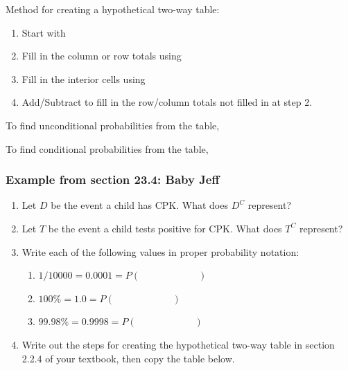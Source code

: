 \documentclass[
]{report}
\providecommand{\tightlist}{%
  \setlength{\itemsep}{0pt}\setlength{\parskip}{0pt}}
\newcommand{\rgs}{\vspace{12pt}} %
\newcommand{\rgi}{\hspace{24pt}}  %
\begin{document}
Method for creating a hypothetical two-way table:

\begin{enumerate}
\def\labelenumi{\arabic{enumi}.}
\item
  Start with
  \rgs
\item
  Fill in the column or row totals using
  \rgs
\item
  Fill in the interior cells using
  \rgs
\item
  Add/Subtract to fill in the row/column totals not filled in at step 2.
\end{enumerate}

\rgi \rgi To find unconditional probabilities from the table,
\rgs

\rgi \rgi To find conditional probabilities from the table,
\rgs

\hypertarget{example-from-section-23.4-baby-jeff}{%
\subsubsection*{Example from section 23.4: Baby Jeff}\label{example-from-section-23.4-baby-jeff}}

\begin{enumerate}
\def\labelenumi{\arabic{enumi}.}
\item
  Let \(D\) be the event a child has CPK. What does \(D^C\) represent?
  \rgs
\item
  Let \(T\) be the event a child tests positive for CPK. What does \(T^C\) represent?
  \rgs
\item
  Write each of the following values in proper probability notation:

  \begin{enumerate}
  \def\labelenumii{\alph{enumii}.}
  \tightlist
  \item
    \(1/10000 = 0.0001 = P( \hspace{1in} )\)
  \item
    \(100\% = 1.0 = P( \hspace{1in} )\)
  \item
    \(99.98\% = 0.9998 = P( \hspace{1in} )\)
  \end{enumerate}
\item
  Write out the steps for creating the hypothetical two-way table in section 2.2.4 of your textbook, then copy the table below.
\end{enumerate}
\end{document}
